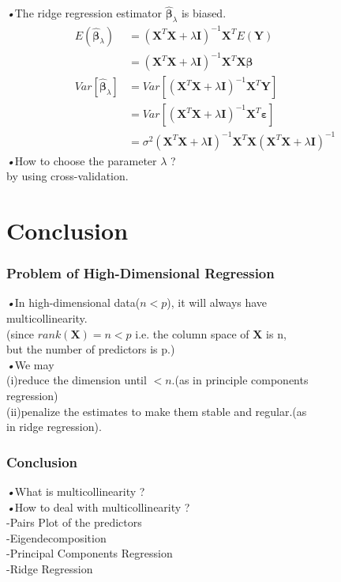 \documentclass{beamer}
\begin{document}
	\begin{frame}
	\emph{•}The ridge regression estimator $\hat{\boldsymbol{\beta}}_{\lambda}$ is biased.
	\begin{equation*}
	\begin{aligned}
	E(\hat{\boldsymbol{\beta}}_{\lambda}) & = (\boldsymbol{X}^T\boldsymbol{X} + \lambda\boldsymbol{I}) ^{-1} \boldsymbol{X}^T E(\boldsymbol{Y})
	\\ & = (\boldsymbol{X}^T\boldsymbol{X} + \lambda\boldsymbol{I}) ^{-1} \boldsymbol{X}^T \boldsymbol{X}\boldsymbol{\beta}
	\\Var[\hat{\boldsymbol{\beta}}_{\lambda}] & = Var[(\boldsymbol{X}^T\boldsymbol{X} + \lambda\boldsymbol{I}) ^{-1} \boldsymbol{X}^T \boldsymbol{Y}]
	\\& = Var[(\boldsymbol{X}^T\boldsymbol{X} + \lambda\boldsymbol{I}) ^{-1} \boldsymbol{X}^T \boldsymbol{\varepsilon} ]
	\\& = \sigma^2 (\boldsymbol{X}^T\boldsymbol{X} + \lambda\boldsymbol{I}) ^{-1} \boldsymbol{X}^T   \boldsymbol{X}  (\boldsymbol{X}^T\boldsymbol{X} + \lambda\boldsymbol{I}) ^{-1}
	\end{aligned}
	\end{equation*}
	\emph{•}How to choose the parameter $\lambda$ ?
	\\\quad by using cross-validation.
	\end{frame}

\section{Conclusion}
	
	\begin{frame}
	\frametitle{Problem of High-Dimensional Regression}
 	\emph{•}In high-dimensional data($n < p$), it will always have
 	\\\quad multicollinearity. 
 	\\\quad (since $rank(\boldsymbol{X}) = n < p$ i.e. the column space of $\boldsymbol{X}$ is n, 
 	\\\quad but the number of predictors is p.) \vspace{0.3cm}
 	\\\emph{•}We may 
 	\\\quad (i)reduce the dimension until $< n$.(as in principle components
 	\\\quad regression)
 	\\\quad (ii)penalize the estimates to make them stable and regular.(as
 	\\\quad in ridge regression). 
	\end{frame}

	\begin{frame}
	\frametitle{Conclusion}
	\emph{•}What is multicollinearity ?
	\vspace{0.3cm}
	\\\emph{•}How to deal with multicollinearity ?
	\vspace{0.1cm}
	\\\quad -Pairs Plot of the predictors
	\\\quad -Eigendecomposition
	\\\quad -Principal Components Regression
	\\\quad -Ridge Regression
	\end{frame}
\end{document}
